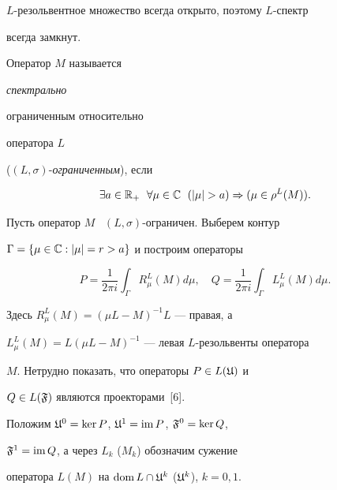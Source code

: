 $L$-резольвентное множество всегда открыто, поэтому $L$-спектр


всегда замкнут.








\begin{defns}


Оператор $M$ называется {\it спектрально


ограниченным относительно} оператора $L$


($(L,\sigma)$-{\it ограниченным}), если


$$


\exists a\in\Bbb R_{+}\ \; \forall\mu\in \Bbb C\ \; (|\mu|>a)\Rightarrow


(\mu\in\rho^{L}(M)).


$$


\end{defns}





Пусть оператор $M$ \ $(L,\sigma)$-ограничен. Выберем контур


$\Gamma=\{\mu\in \Bbb C:|\mu|=r>a\}$ и построим операторы


$$


P=\frac{1}{2\pi i}\int_{\Gamma}R^{L}_{\mu}(M)d\mu,\quad


Q=\frac{1}{2\pi i}\int_{\Gamma}L^{L}_{\mu}(M)d\mu.


$$


Здесь $R^{L}_{\mu}(M)=(\mu L-M)^{-1}L$ --- правая, а


$L^{L}_{\mu}(M)=L(\mu L-M)^{-1}$ --- левая $L$-резольвенты оператора


$M$. Нетрудно показать, что операторы $P\in L(\frak U)$ и


$Q\in L(\frak F)$ являются проекторами~[6].


Положим $\frak U^0=\ker P$, $\frak U^1=\operatorname{im} P$, $\frak F^0=\ker Q$,


$\frak F^1=\operatorname{im} Q$, а через $L_{k}$ ($M_{k}$) обозначим сужение


оператора $L(M)$ на $\dom L\cap\frak U^{k}$ ($\frak


U^{k}$), $k=0,1$.








